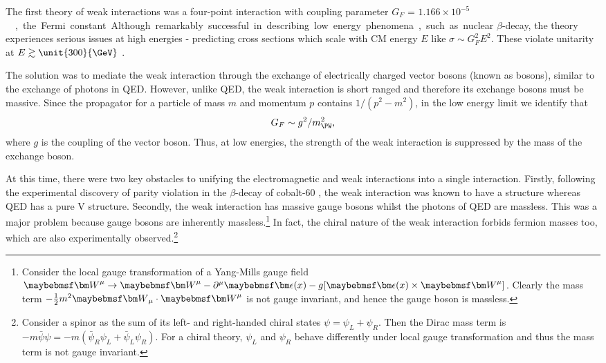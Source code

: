 
The first theory of weak interactions was a four-point interaction with coupling parameter 
$G_F$ = \unit{$1.166\times 10^{-5}$}{\GeV\rpsquared}, the Fermi constant. Although 
remarkably successful in describing low energy phenomena, such as nuclear $\beta$-decay, 
the theory experiences serious issues at high energies - predicting cross sections which 
scale with \ac{CM} energy $E$ like $\sigma \sim G_F^2 E^2$. These violate unitarity at 
$E \gtrsim \unit{300}{\GeV}$ \cite{Aitchison}.

The solution was to mediate the weak interaction through the exchange of electrically 
charged vector bosons (known as \PWpm bosons), similar to the exchange of photons in 
\ac{QED}. However, unlike \ac{QED}, the weak interaction is short ranged and therefore 
its exchange bosons must be massive. Since the propagator for a particle of mass $m$ and 
momentum $p$ contains $1 / (p^2 - m^2)$, in the low energy limit we identify that
\begin{equation}
	G_F \sim g^2 / m_{\PW}^2 ,
\end{equation}
where $g$ is the coupling of the vector boson. Thus, at low energies, the strength of the weak interaction is suppressed by the mass of the exchange boson.

At this time, there were two key obstacles to unifying the electromagnetic and weak 
interactions into a single interaction. Firstly, following the experimental discovery of 
parity violation in the $\beta$-decay of cobalt-60 \cite{Wu:1957}, the weak interaction
was known to have a \VminusA structure whereas \ac{QED} has a pure V structure. 
Secondly, the weak interaction has massive gauge bosons whilst the photons of \ac{QED} are 
massless. This was a major problem because gauge bosons are inherently massless.\footnote{
	Consider the local gauge transformation of a Yang-Mills gauge field 
	$\bvec{W}^{\mu} \rightarrow \bvec{W}^{\mu} - \partial^{\mu} \bvec{\epsilon}(x)
	- g \lbrack \bvec{\epsilon}(x) \times \bvec{W}^{\mu} \rbrack$. Clearly the mass term 
	$-\tfrac{1}{2}m^2 \bvec{W}_{\mu} \cdot \bvec{W}^{\mu}$ is not gauge invariant, and 
	hence the gauge boson is massless.}
In fact, the chiral nature of the weak interaction forbids fermion masses too, which are
also experimentally observed.\footnote{
	Consider a spinor as the sum of its left- and right-handed chiral states 
	$\psi = \psi_L + \psi_R$. Then the Dirac mass term is $-m \bar{\psi} \psi = 
	-m (\bar{\psi}_R \psi_L + \bar{\psi}_L \psi_R)$. For a chiral theory, $\psi_L$ and
	$\psi_R$ behave differently under local gauge transformation and thus the mass term is not gauge invariant.
}

